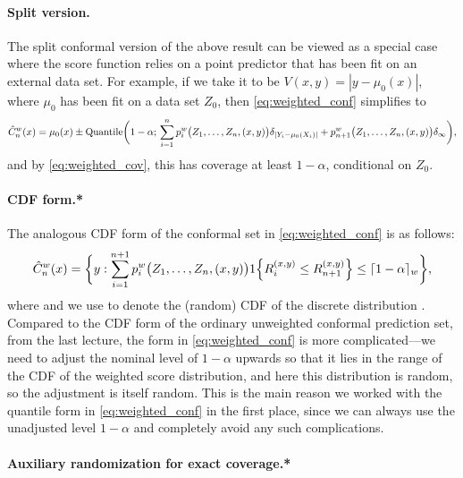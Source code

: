 \documentclass{article}
\begin{document}
\paragraph{Split version.}

The split conformal version of the above result can be viewed as a special case  
where the score function relies on a point predictor that has been fit on an
external data set. For example, if we take it to be $V(x,y) = |y-\mu_0(x)|$,
where $\mu_0$ has been fit on a data set $Z_0$, then \eqref{eq:weighted_conf} 
simplifies to       
\[
\hat{C}^w_n(x) = \mu_0(x) \pm \mathrm{Quantile}\bigg(1-\alpha; \, 
\sum_{i=1}^n p^w_i\big( Z_1,\ldots,Z_n,(x,y) \big) \delta_{|Y_i - \mu_0(X_i)|}
+ p^w_{n+1}\big( Z_1,\ldots,Z_n,(x,y) \big) \delta_\infty \bigg),
\]
and by \eqref{eq:weighted_cov}, this has coverage at least $1-\alpha$,
conditional on $Z_0$.   

\paragraph{CDF form.*}

\def\hF{\hat{F}}

The analogous CDF form of the conformal set in \eqref{eq:weighted_conf} is as
follows: 
\begin{equation}
\label{eq:weighted_cdf}
\hat{C}^w_n(x) = \bigg\{ y : \sum_{i=1}^{n+1} p^w_i\big( Z_1,\dots,Z_n,(x,y) \big) 
1\Big\{ R_i^{(x,y)} \leq R^{(x,y)}_{n+1} \Big\} \leq \lceil 1-\alpha \rceil_w
\bigg\},   
\end{equation}
where \smash{$\lceil 1-\alpha \rceil_w = \min\{ \tau \in \mathrm{range}(\hF^w_n)
  : \tau \geq 1-\alpha\}$} and we use \smash{$\hF^w_n$} to denote the (random)
CDF of the discrete distribution . 
Compared to the CDF form of the ordinary unweighted conformal prediction set,
from the last lecture, the form in \eqref{eq:weighted_conf} is more
complicated---we need to adjust the nominal level of $1-\alpha$ upwards so that
it lies in the range of the CDF of the weighted score distribution, and here
this distribution is random, so the adjustment is itself random. This is the
main reason we worked with the quantile form in \eqref{eq:weighted_conf} in the
first place, since we can always use the unadjusted level $1-\alpha$ and
completely avoid any such complications.

\paragraph{Auxiliary randomization for exact coverage.*}
\end{document}
